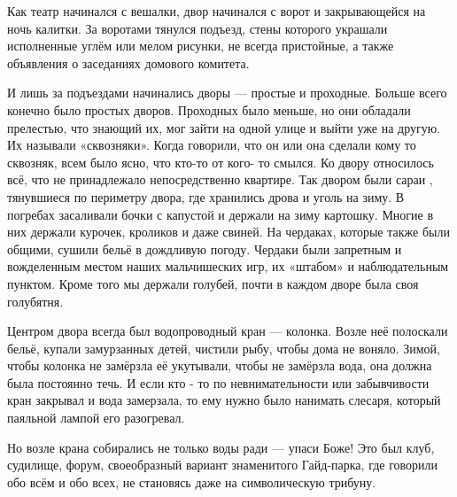 Как театр начинался с вешалки, двор начинался с ворот и закрывающейся на ночь
калитки. За воротами тянулся подъезд, стены которого  украшали исполненные
углём или мелом рисунки, не всегда пристойные, а также объявления о заседаниях
домового комитета. 

И лишь за подъездами начинались дворы — простые и проходные. Больше всего
конечно было простых дворов. Проходных было меньше, но они обладали прелестью,
что знающий их, мог  зайти на одной улице и выйти уже на другую. Их называли
«сквозняки». Когда говорили, что он или она сделали  кому то  сквозняк, всем
было ясно, что кто-то от кого- то смылся. Ко двору относилось всё, что не
принадлежало  непосредственно квартире. Так двором  были сараи , тянувшиеся по
периметру двора, где хранились дрова и уголь на зиму.  В погребах засаливали
бочки с капустой и держали  на зиму картошку.  Многие в них держали курочек,
кроликов и даже свиней. На чердаках, которые также были общими, сушили бельё в
дождливую погоду. Чердаки были запретным и вожделенным местом наших
мальчишеских игр, их «штабом» и наблюдательным пунктом. Кроме того мы держали
голубей,  почти в каждом дворе была своя голубятня. 

Центром двора  всегда был водопроводный кран — колонка. Возле неё полоскали
бельё, купали замурзанных детей, чистили рыбу,  чтобы дома не воняло. Зимой,
чтобы колонка не замёрзла её укутывали, чтобы не замёрзла вода, она должна была
постоянно течь. И если кто - то по невнимательности или забывчивости кран
закрывал и вода замерзала, то ему нужно было нанимать слесаря, который паяльной
лампой его разогревал.

Но возле крана собирались не только  воды ради — упаси Боже! Это был клуб,
судилище, форум, своеобразный вариант знаменитого Гайд-парка, где говорили обо
всём и обо всех, не становясь даже на символическую трибуну.

